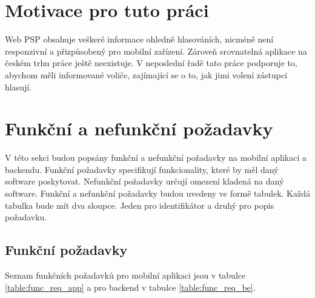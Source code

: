 \section{Motivace pro tuto práci}
Web PSP obsahuje veškeré informace ohledně hlasováních, nicméně není responzivní a přizpůsobený pro mobilní zařízení. Zároveň srovnatelná aplikace na českém trhu práce ještě neexistuje. V neposlední řadě tato práce podporuje to, abychom měli informované voliče, zajímající se \linebreak o to, jak jimi volení zástupci hlasují.

\section{Funkční a nefunkční požadavky}

V této sekci budou popsány funkční a nefunkční požadavky na mobilní aplikaci a backendu. Funkční požadavky specifikují funkcionality, které by měl daný software poskytovat. Nefunkční požadavky určují omezení kladená na daný software. Funkční a nefunkční požadavky budou uvedeny ve formě tabulek. Každá tabulka bude mít dva sloupce. Jeden pro identifikátor a druhý pro popis požadavku.

\subsection*{Funkční požadavky}
Seznam funkčních požadavků pro mobilní aplikaci jsou v tabulce \ref{table:func_req_app} a pro backend \linebreak v tabulce \ref{table:func_req_be}.

